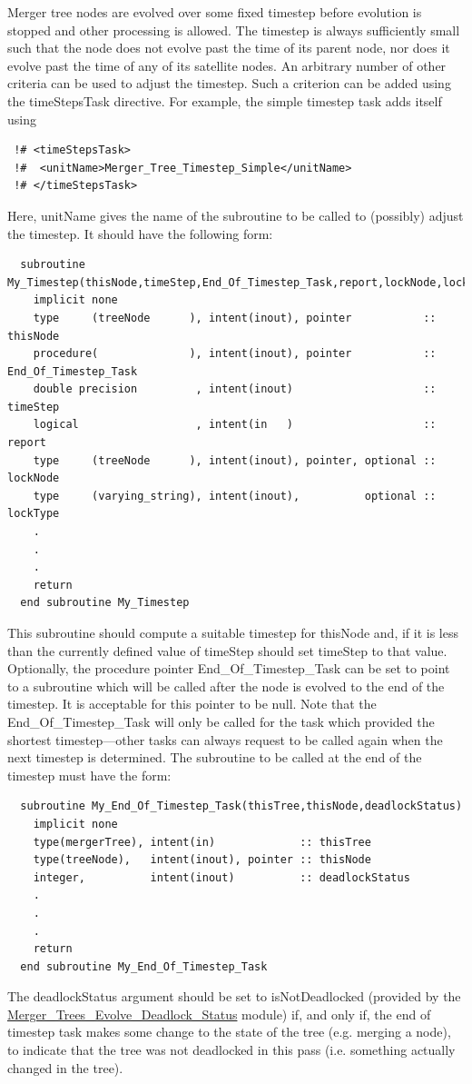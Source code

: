 Merger tree nodes are evolved over some fixed timestep before evolution is stopped and other processing is allowed. The timestep is always sufficiently small such that the node does not evolve past the time of its parent node, nor does it evolve past the time of any of its satellite nodes. An arbitrary number of other criteria can be used to adjust the timestep. Such a criterion can be added using the {\normalfont \ttfamily timeStepsTask} directive. For example, the {\normalfont \ttfamily simple} timestep task adds itself using
\begin{verbatim}
 !# <timeStepsTask>
 !#  <unitName>Merger_Tree_Timestep_Simple</unitName>
 !# </timeStepsTask>
\end{verbatim}
Here, {\normalfont \ttfamily unitName} gives the name of the subroutine to be called to (possibly) adjust the timestep. It should have the following form:
\begin{verbatim}
  subroutine My_Timestep(thisNode,timeStep,End_Of_Timestep_Task,report,lockNode,lockType)
    implicit none
    type     (treeNode      ), intent(inout), pointer           :: thisNode
    procedure(              ), intent(inout), pointer           :: End_Of_Timestep_Task
    double precision         , intent(inout)                    :: timeStep
    logical                  , intent(in   )                    :: report
    type     (treeNode      ), intent(inout), pointer, optional :: lockNode
    type     (varying_string), intent(inout),          optional :: lockType
    .
    .
    .
    return
  end subroutine My_Timestep
\end{verbatim}
This subroutine should compute a suitable timestep for {\normalfont \ttfamily thisNode} and, if it is less than the currently defined value of {\normalfont \ttfamily timeStep} should set {\normalfont \ttfamily timeStep} to that value. Optionally, the procedure pointer {\normalfont \ttfamily End\_Of\_Timestep\_Task} can be set to point to a subroutine which will be called after the node is evolved to the end of the timestep. It is acceptable for this pointer to be null. Note that the {\normalfont \ttfamily End\_Of\_Timestep\_Task} will only be called for the task which provided the shortest timestep---other tasks can always request to be called again when the next timestep is determined. The subroutine to be called at the end of the timestep must have the form:
\begin{verbatim}
  subroutine My_End_Of_Timestep_Task(thisTree,thisNode,deadlockStatus)
    implicit none
    type(mergerTree), intent(in)             :: thisTree
    type(treeNode),   intent(inout), pointer :: thisNode
    integer,          intent(inout)          :: deadlockStatus
    .
    .
    .
    return
  end subroutine My_End_Of_Timestep_Task
\end{verbatim}
The {\normalfont \ttfamily deadlockStatus} argument should be set to {\normalfont \ttfamily isNotDeadlocked} (provided by the \hyperlink{merger_trees.evolve.deadlock_options.F90:merger_trees_evolve_deadlock_status}{\normalfont \ttfamily Merger\_Trees\_Evolve\_Deadlock\_Status} module) if, and only if, the end of timestep task makes some change to the state of the tree (e.g. merging a node), to indicate that the tree was not deadlocked in this pass (i.e. something actually changed in the tree).


